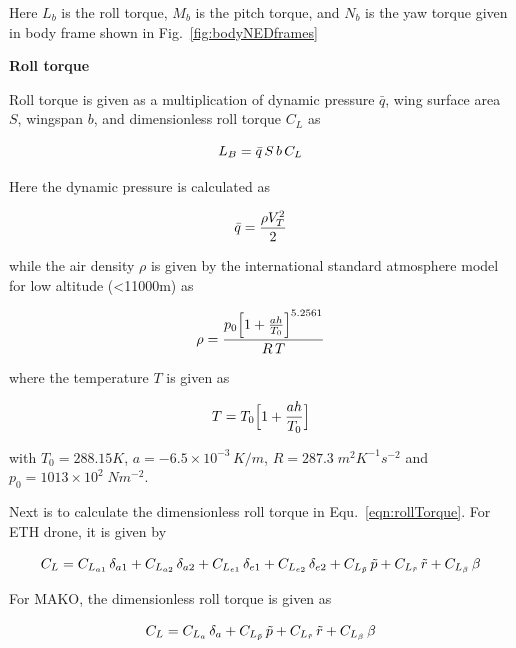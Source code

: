 Here $L_b$ is the roll torque, $M_b$ is the pitch torque, and $N_b$ is the yaw torque given in body frame shown in Fig.~\ref{fig:bodyNEDframes}

\textbf{Roll torque}

Roll torque is given as a multiplication of dynamic pressure $\bar{q}$, wing surface area $S$, wingspan $b$,  and dimensionless roll torque $C_L$ as 

\begin{equation}{\label{eqn:rollTorque}}
L_B = \bar{q} \, S \, b \, C_L
\end{equation}

Here the dynamic pressure is calculated as 

\begin{equation}{\label{eqn:dynamicPressure}}
\bar{q}=\frac{\rho V_T^2}{2} 
\end{equation}

while the air density $\rho$ is given by the international standard atmosphere model for low altitude (<11000m) as 

\begin{equation}{\label{eqn:airDensityStandard}}
\rho = \frac{p_0 \Big[ 1+\frac{ah}{T_0} \Big]^{5.2561}}{R\,T}
\end{equation}

where the temperature $T$ is given as

\begin{equation}{\label{eqn:temperature}}
T=T_0\Big[ 1 + \frac{ah}{T_0} \Big]
\end{equation}

with $T_0=288.15K$, $a = -6.5 \times 10^{-3} \, K/m$, $R=287.3\;m^2K^{-1}s^{-2}$ and $p_0=1013 \times 10^2 \;Nm^{-2}$.

Next is to calculate the dimensionless roll torque in Equ.~\ref{eqn:rollTorque}.
For ETH drone, it is given by \cite{stevens2015aircraft,ducard2009fault,mockli2006guidance}

\begin{equation}{\label{eqn:bigCraftC_L}}
C_L = C_{L_{a1}} \, \delta_{a1} + C_{L_{a2}} \, \delta_{a2} + C_{L_{e1}} \, \delta_{e1} + C_{L_{e2}} \, \delta_{e2} + C_{L_{\tilde{p}}} \, \tilde{p} + C_{L_{\tilde{r}}} \, \tilde{r} +  C_{L_\beta} \, \beta 
\end{equation}

For MAKO, the dimensionless roll torque is given as

\begin{equation}{\label{eqn:makoC_L}}
C_L = C_{L_{a}} \, \delta_{a} + C_{L_{\tilde{p}}} \, \tilde{p} + C_{L_{\tilde{r}}} \, \tilde{r} +  C_{L_\beta} \, \beta 
\end{equation}

